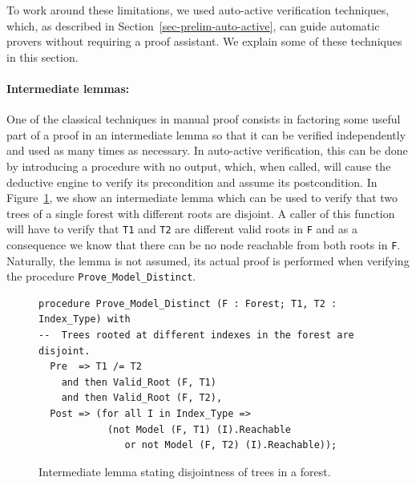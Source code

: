 \documentclass{llncs}
\begin{document}
To work around these limitations, we used auto-active verification techniques, which,
as described in Section~\ref{sec-prelim-auto-active}, can guide automatic provers without
requiring a proof assistant. We explain some of these techniques in this section.

\paragraph{Intermediate lemmas:}
One of the classical techniques in manual proof consists in factoring some useful
part of a proof in an intermediate lemma so that it can be verified independently and
used as many times as necessary. In auto-active verification, this can be done by introducing
a procedure with no output, which, when called, will cause the deductive engine to verify
its precondition and assume its postcondition. In Figure~\ref{fig-proof-lem}, we show an
intermediate lemma which can be used to verify that two trees of a single forest with different
roots are disjoint. A caller of this function will have to verify that \texttt{T1} and \texttt{T2} are different
valid roots in \texttt{F} and as a consequence we know that there can be no node reachable from both roots in \texttt{F}.
Naturally, the lemma is not assumed, its actual proof is performed when verifying the procedure
\texttt{Prove\_Model\_Distinct}.

\begin{figure}
\begin{small}
\begin{lstlisting}
procedure Prove_Model_Distinct (F : Forest; T1, T2 : Index_Type) with
--  Trees rooted at different indexes in the forest are disjoint.
  Pre  => T1 /= T2
    and then Valid_Root (F, T1)
    and then Valid_Root (F, T2),
  Post => (for all I in Index_Type =>
            (not Model (F, T1) (I).Reachable
               or not Model (F, T2) (I).Reachable));
\end{lstlisting}
\end{small}
\caption{\label{fig-proof-lem} Intermediate lemma stating disjointness of trees in a forest.}
\end{figure}
\end{document}
